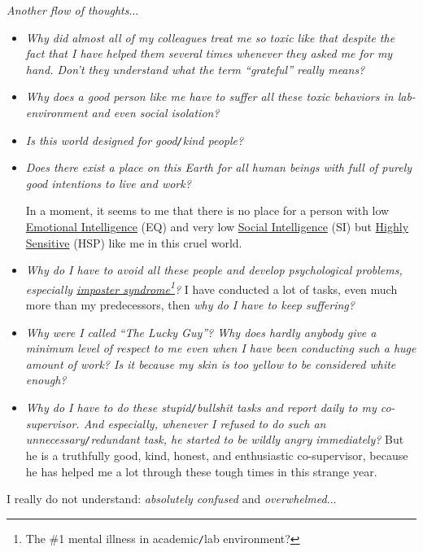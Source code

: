 \documentclass[12pt]{article}
\numberwithin{equation}{section}
\begin{document}
\noindent
{} \textit{Another flow of thoughts}$\ldots$
\begin{itemize}
    \setlength\itemsep{0em}
    \item \textit{Why did almost all of my colleagues treat me so toxic like that despite the fact that I have helped them several times whenever they asked me for my hand. Don't they understand what the term ``grateful'' really means?}
    \item \textit{Why does a good person like me have to suffer all these toxic behaviors in lab-environment and even social isolation?}
    \item \textit{Is this world designed for good\texttt{/}kind people?}
    \item \textit{Does there exist a place on this Earth for all human beings with full of purely good intentions to live and work?}
    
    In a moment, it seems to me that there is no place for a person with low \href{https://en.wikipedia.org/wiki/Emotional_intelligence}{Emotional Intelligence} (EQ) and very low \href{https://en.wikipedia.org/wiki/Social_intelligence}{Social Intelligence} (SI) but \href{https://hsperson.com/}{Highly Sensitive} (HSP) like me in this cruel world.    
    \item \textit{Why do I have to avoid all these people and develop psychological problems, especially \href{https://en.wikipedia.org/wiki/Impostor_syndrome}{imposter syndrome}\footnote{The \#1 mental illness in academic\texttt{/}lab environment?}?} I have conducted a lot of tasks, even much more than my predecessors, then \textit{why do I have to keep suffering?}
    \item \textit{Why were I called ``The Lucky Guy''? Why does hardly anybody give a minimum level of respect to me even when I have been conducting such a huge amount of work? Is it because my skin is too yellow to be considered white enough?}
    \item \textit{Why do I have to do these stupid\texttt{/}bullshit tasks and report daily to my co-supervisor. And especially, whenever I refused to do such an unnecessary\texttt{/}redundant task, he started to be wildly angry immediately?} But he is a truthfully good, kind, honest, and enthusiastic co-supervisor, because he has helped me a lot through these tough times in this strange year.
\end{itemize}
I really do not understand: \textit{absolutely confused} and \textit{overwhelmed}$\ldots$
\end{document}
